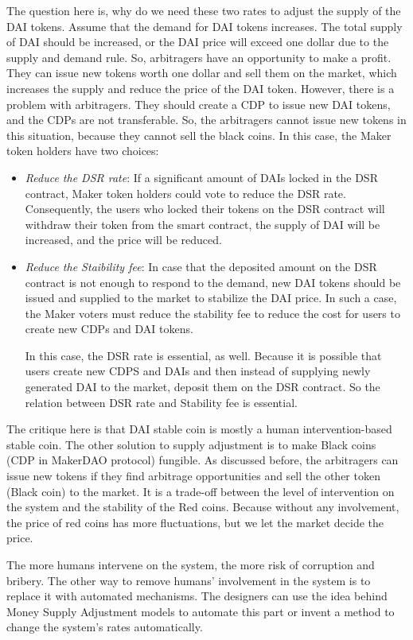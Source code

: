 The question here is, why do we need these two rates to adjust the supply of the DAI tokens. Assume that the demand for DAI tokens increases. The total supply of DAI should be increased, or the DAI price will exceed one dollar due to the supply and demand rule. So, arbitragers have an opportunity to make a profit. They can issue new tokens worth one dollar and sell them on the market, which increases the supply and reduce the price of the DAI token. However, there is a problem with arbitragers. They should create a CDP to issue new DAI tokens, and the CDPs are not transferable. So, the arbitragers cannot issue new tokens in this situation, because they cannot sell the black coins. In this case, the Maker token holders have two choices:
\begin{itemize}
	\item \emph{Reduce the DSR rate}: If a significant amount of DAIs locked in the DSR contract, Maker token holders could vote to reduce the DSR rate. Consequently, the users who locked their tokens on the DSR contract will withdraw their token from the smart contract, the supply of DAI will be increased, and the price will be reduced. 
	\item \emph{ Reduce the Staibility fee}: In case that the deposited amount on the DSR contract is not enough to respond to the demand, new DAI tokens should be issued and supplied to the market to stabilize the DAI price. In such a case, the Maker voters must reduce the stability fee to reduce the cost for users to create new CDPs and DAI tokens. 
	
In this case, the DSR rate is essential, as well. Because it is possible that users create new CDPS and DAIs and then instead of supplying newly generated DAI to the market, deposit them on the DSR contract. So the relation between DSR rate and Stability fee is essential.
\end{itemize}

The critique here is that DAI stable coin is mostly a human intervention-based stable coin. The other solution to supply adjustment is to make Black coins (CDP in MakerDAO protocol) fungible. As discussed before, the arbitragers can issue new tokens if they find arbitrage opportunities and sell the other token (Black coin) to the market. It is a trade-off between the level of intervention on the system and the stability of the Red coins. Because without any involvement, the price of red coins has more fluctuations, but we let the market decide the price. 

The more humans intervene on the system, the more risk of corruption and bribery. The other way to remove humans' involvement in the system is to replace it with automated mechanisms. The designers can use the idea behind Money Supply Adjustment models to automate this part or invent a method to change the system's rates automatically.

